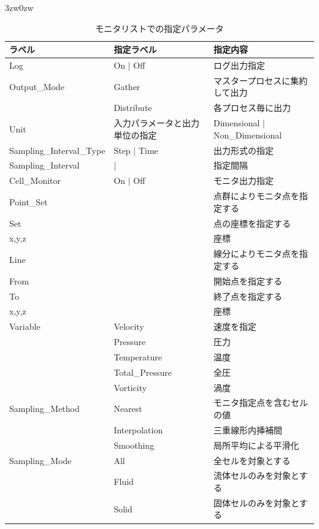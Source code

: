 \begin{indentation}{3zw}{0zw}
\begin{table}[htdp]
\caption{モニタリストでの指定パラメータ}
\begin{center}
\small
\begin{tabular}{lll} \toprule
ラベル & 指定ラベル & 指定内容\\ \midrule
Log & On $|$ Off & ログ出力指定\\
Output\_Mode & Gather & マスタープロセスに集約して出力\\
& Distribute & 各プロセス毎に出力\\
Unit & 入力パラメータと出力単位の指定 & Dimensional $|$ Non\_Dimensional\\
Sampling\_Interval\_Type & Step $|$ Time & 出力形式の指定\\
Sampling\_Interval & | & 指定間隔\\ 
Cell\_Monitor & On $|$ Off & モニタ出力指定\\ \hline
Point\_Set & & 点群によりモニタ点を指定する\\
Set & & 点の座標を指定する\\
x,y,z & & 座標\\ \hline
Line & & 線分によりモニタ点を指定する\\
From & & 開始点を指定する\\
To & & 終了点を指定する\\
x,y,z & & 座標\\ \hline
Variable & Velocity & 速度を指定\\
 & Pressure & 圧力\\
 & Temperature & 温度\\
 & Total\_Pressure & 全圧\\
 & Vorticity & 渦度\\ \hline
Sampling\_Method & Nearest & モニタ指定点を含むセルの値\\
 & Interpolation & 三重線形内挿補間\\
 & Smoothing & 局所平均による平滑化\\ \hline
Sampling\_Mode & All & 全セルを対象とする\\
 & Fluid & 流体セルのみを対象とする\\
 & Solid & 固体セルのみを対象とする\\ \bottomrule
\end{tabular}
\end{center}
\label{tbl:monitor list}
\end{table}


\end{indentation}
